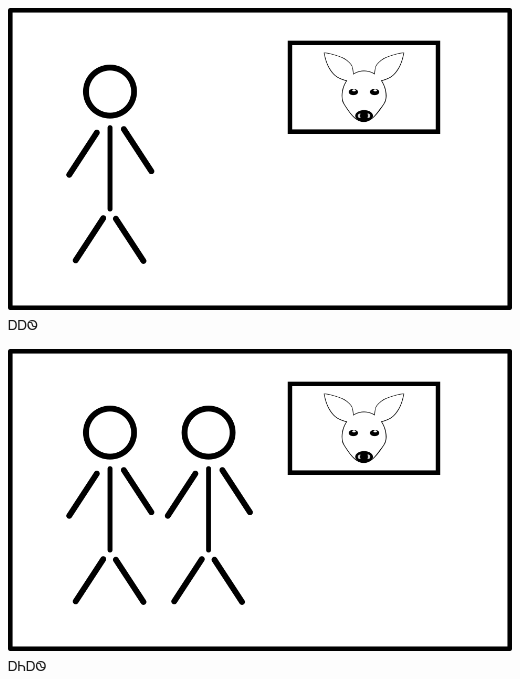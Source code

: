 \documentclass[avery8371]{flashcards}%
\begin{document}

    \begin{flashcard}{
        \includegraphics[width=0.95\columnwidth,height=.51\columnwidth,keepaspectratio]{../artwork/flags/aahwi-flag}
    }
        \Huge ᎠᎠᏫ
    \end{flashcard}
    \begin{flashcard}{
        \includegraphics[width=0.95\columnwidth,height=.51\columnwidth,keepaspectratio]{../artwork/flags/aniahwi-flag}
    }
        \Huge ᎠᏂᎠᏫ
    \end{flashcard}
\end{document}
